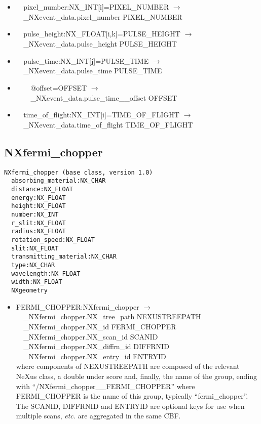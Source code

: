 \documentclass[11pt]{article}
\begin{document}
{{\begin{itemize}
\item{\verb|  |pixel\_number:NX\_INT[i]=PIXEL\_NUMBER $\rightarrow$\\
\verb|  |\_NXevent\_data.pixel\_number PIXEL\_NUMBER}

\item{\verb|  |pulse\_height:NX\_FLOAT[i,k]=PULSE\_HEIGHT $\rightarrow$\\
\verb|  |\_NXevent\_data.pulse\_height PULSE\_HEIGHT}

\item{\verb|  |pulse\_time:NX\_INT[j]=PULSE\_TIME $\rightarrow$\\
\verb|  |\_NXevent\_data.pulse\_time PULSE\_TIME}

\item{\verb|    |@offset=OFFSET $\rightarrow$\\
\verb|    |\_NXevent\_data.pulse\_time\_\_offset OFFSET}

\item{\verb|  |time\_of\_flight:NX\_INT[i]=TIME\_OF\_FLIGHT $\rightarrow$\\
\verb|  |\_NXevent\_data.time\_of\_flight TIME\_OF\_FLIGHT}
\end{itemize}
\subsection{NXfermi\_chopper}

\begin{verbatim}
NXfermi_chopper (base class, version 1.0)
  absorbing_material:NX_CHAR
  distance:NX_FLOAT
  energy:NX_FLOAT
  height:NX_FLOAT
  number:NX_INT
  r_slit:NX_FLOAT
  radius:NX_FLOAT
  rotation_speed:NX_FLOAT
  slit:NX_FLOAT
  transmitting_material:NX_CHAR
  type:NX_CHAR
  wavelength:NX_FLOAT
  width:NX_FLOAT
  NXgeometry
\end{verbatim}

\begin{itemize}

\item{FERMI\_CHOPPER:NXfermi\_chopper $\rightarrow$\\
\verb|  |\_NXfermi\_chopper.NX\_tree\_path    NEXUSTREEPATH \\
\verb|  |\_NXfermi\_chopper.NX\_id            FERMI\_CHOPPER\\
\verb|  |\_NXfermi\_chopper.NX\_scan\_id      SCANID \\
\verb|  |\_NXfermi\_chopper.NX\_diffrn\_id    DIFFRNID \\
\verb|  |\_NXfermi\_chopper.NX\_entry\_id     ENTRYID \\
where components of NEXUSTREEPATH are composed of the
relevant NeXus class, a double under score and, finally, the
name of the group, ending with ``/NXfermi\_chopper\_\_FERMI\_CHOPPER''
where FERMI\_CHOPPER is the name of this group, typically ``fermi\_chopper''.
The SCANID, DIFFRNID and ENTRYID are optional keys for use
when multiple scans, {\it etc.} are aggregated in the same CBF.}


\end{itemize}}}
\end{document}
